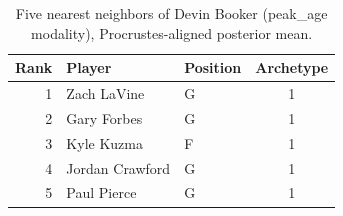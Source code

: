 \begin{table}[htbp]
  \centering\small
  \begin{tabular}{rllc}
    \toprule
    Rank & Player & Position & Archetype \\
    \midrule
    1 & Zach LaVine & G & 1 \\
    2 & Gary Forbes & G & 1 \\
    3 & Kyle Kuzma & F & 1 \\
    4 & Jordan Crawford & G & 1 \\
    5 & Paul Pierce & G & 1 \\
    \bottomrule
  \end{tabular}
  \caption{Five nearest neighbors of Devin Booker (peak_age modality), Procrustes-aligned posterior mean.}
  \label{tab:Devin_Booker_neighbors_peak_age}
\end{table}

